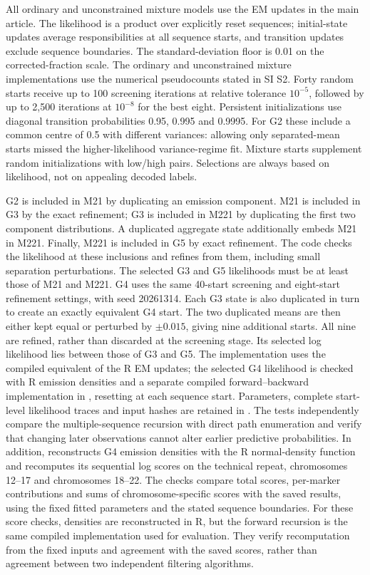 \documentclass[11pt]{article}
\begin{document}
All ordinary and unconstrained mixture models use the EM updates in the
main article. The likelihood is a product over explicitly reset sequences;
initial-state updates average responsibilities at all sequence starts, and
transition updates exclude sequence boundaries. The standard-deviation floor
is 0.01 on the corrected-fraction scale. The ordinary and unconstrained
mixture implementations use the numerical pseudocounts stated in SI S2.
Forty random starts receive up to
100 screening iterations at relative tolerance $10^{-5}$, followed by up to
2,500 iterations at $10^{-8}$ for the best eight. Persistent initializations
use diagonal transition probabilities 0.95, 0.995 and 0.9995. For G2 these
include a common centre of 0.5 with different variances: allowing only
separated-mean starts missed the higher-likelihood variance-regime fit.
Mixture starts supplement random initializations with low/high pairs.
Selections are always based on likelihood, not on appealing decoded labels.

G2 is included in M21 by duplicating an emission component. M21 is included
in G3 by the exact refinement; G3 is included in M221 by duplicating the
first two component distributions. A duplicated aggregate state additionally
embeds M21 in M221. Finally, M221 is included in G5 by exact refinement.
The code checks the likelihood at these inclusions and refines from them,
including small separation perturbations. The selected G3 and G5 likelihoods
must be at least those of M21 and M221. G4 uses the same 40-start screening
and eight-start refinement settings, with seed 20261314. Each G3 state is
also duplicated in turn to create an exactly equivalent G4 start. The two
duplicated means are then either kept equal or perturbed by $\pm0.015$, giving
nine additional starts. All nine are refined, rather than discarded at the
screening stage. Its selected log likelihood lies between those of G3 and G5.
The implementation uses the compiled equivalent of the R EM updates; the
selected G4 likelihood is checked with R emission densities and a separate
compiled forward--backward implementation in
, resetting at each sequence start.
Parameters, complete start-level likelihood traces
and input hashes are retained in . The tests independently compare the
multiple-sequence recursion with direct path enumeration and verify that
changing later observations cannot alter earlier predictive probabilities.
In addition,  reconstructs G4
emission densities with the R normal-density function and recomputes its
sequential log scores on the technical repeat, chromosomes 12--17 and
chromosomes 18--22. The checks compare total scores, per-marker contributions
and sums of chromosome-specific scores with the saved results, using the
fixed fitted parameters and the stated sequence boundaries.
For these score checks, densities are reconstructed in R, but the forward
recursion is the same compiled implementation used for evaluation. They
verify recomputation from the fixed inputs and agreement with the saved
scores, rather than agreement between two independent filtering algorithms.
\end{document}
